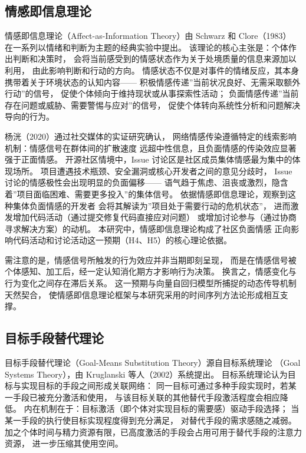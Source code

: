 \subsection{情感即信息理论}

情感即信息理论（Affect-as-Information Theory）由 Schwarz 和 Clore（1983）
在一系列以情绪和判断为主题的经典实验中提出\cite{schwarz1983moods}。
该理论的核心主张是：个体作出判断和决策时，
会将当前感受到的情感状态作为关于处境质量的信息来源加以利用，
由此影响判断和行动的方向。
情感状态不仅是对事件的情绪反应，其本身携带着关于环境状态的认知内容——
积极情感传递”当前状况良好、无需采取额外行动”的信号，
促使个体倾向于维持现状或从事探索性活动；
负面情感传递”当前存在问题或威胁、需要警惕与应对”的信号，
促使个体转向系统性分析和问题解决导向的行为。

杨{\notoserifjk 洸}（2020）通过社交媒体的实证研究确认，
网络情感传染遵循特定的线索影响机制：情感信号在群体间的扩散速度
远超中性信息，且负面情感的传染效应显著强于正面情感\cite{yang2020sentiment}。
开源社区情境中，Issue 讨论区是社区成员集体情感最为集中的体现场所。
项目遭遇技术瓶颈、安全漏洞或核心开发者之间的意见分歧时，
Issue 讨论的情感极性会出现明显的负面偏移——
语气趋于焦虑、沮丧或激烈，隐含着”项目面临困难、需要更多投入”的集体信号。
依据情感即信息理论，观察到这种集体负面情感的开发者
会将其解读为”项目处于需要行动的危机状态”，
进而激发增加代码活动（通过提交修复代码直接应对问题）
或增加讨论参与（通过协商寻求解决方案）的动机。
本研究中，情感即信息理论构成了社区负面情感
正向影响代码活动和讨论活动这一预期（H4、H5）的核心理论依据。

需注意的是，情感信号所触发的行为效应并非当期即刻呈现，
而是在情感信号被个体感知、加工后，经一定认知消化期方才影响行为决策。
换言之，情感变化与行为变化之间存在滞后关系。
这一预期与向量自回归模型所捕捉的动态传导机制天然契合，
使情感即信息理论框架与本研究采用的时间序列方法论形成相互支撑。

\subsection{目标手段替代理论}

目标手段替代理论（Goal-Means Substitution Theory）源自目标系统理论
（Goal Systems Theory），由 Kruglanski 等人（2002）系统提出\cite{kruglanski2002theory}。
目标系统理论认为目标与实现目标的手段之间形成关联网络：
同一目标可通过多种手段实现时，若某一手段已被充分激活和使用，
与该目标关联的其他替代手段激活程度会相应降低。
内在机制在于：目标激活（即个体对实现目标的需要感）驱动手段选择；
当某一手段的执行使目标实现程度得到充分满足，
对替代手段的需求感随之减弱。
加之个体时间与精力资源有限，已高度激活的手段会占用可用于替代手段的注意力资源，
进一步压缩其使用空间。

